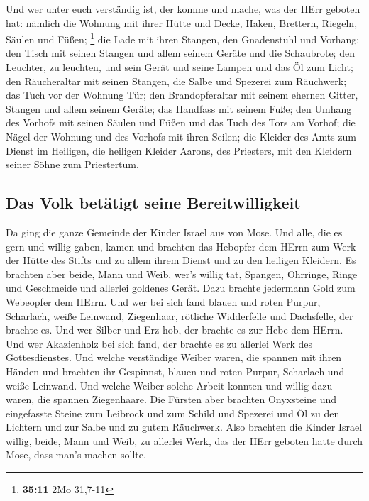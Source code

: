 Und wer unter euch verständig ist, der komme und mache,
was der HErr geboten hat:  nämlich die Wohnung mit ihrer
Hütte und Decke, Haken, Brettern, Riegeln, Säulen und Füßen; \footnote{\textbf{35:11}
  2Mo 31,7-11}  die Lade mit ihren Stangen, den
Gnadenstuhl und Vorhang;  den Tisch mit seinen Stangen
und allem seinem Geräte und die Schaubrote;  den
Leuchter, zu leuchten, und sein Gerät und seine Lampen und das Öl zum
Licht;  den Räucheraltar mit seinen Stangen, die Salbe
und Spezerei zum Räuchwerk; das Tuch vor der Wohnung Tür;
 den Brandopferaltar mit seinem ehernen Gitter, Stangen
und allem seinem Geräte; das Handfass mit seinem Fuße; 
den Umhang des Vorhofs mit seinen Säulen und Füßen und das Tuch des Tors
am Vorhof;  die Nägel der Wohnung und des Vorhofs mit
ihren Seilen;  die Kleider des Amts zum Dienst im
Heiligen, die heiligen Kleider Aarons, des Priesters, mit den Kleidern
seiner Söhne zum Priestertum.

\hypertarget{das-volk-betuxe4tigt-seine-bereitwilligkeit}{%
\subsection{Das Volk betätigt seine
Bereitwilligkeit}\label{das-volk-betuxe4tigt-seine-bereitwilligkeit}}

 Da ging die ganze Gemeinde der Kinder Israel aus von
Mose.  Und alle, die es gern und willig gaben, kamen und
brachten das Hebopfer dem HErrn zum Werk der Hütte des Stifts und zu
allem ihrem Dienst und zu den heiligen Kleidern.  Es
brachten aber beide, Mann und Weib, wer's willig tat, Spangen, Ohrringe,
Ringe und Geschmeide und allerlei goldenes Gerät. Dazu brachte jedermann
Gold zum Webeopfer dem HErrn.  Und wer bei sich fand
blauen und roten Purpur, Scharlach, weiße Leinwand, Ziegenhaar, rötliche
Widderfelle und Dachsfelle, der brachte es.  Und wer
Silber und Erz hob, der brachte es zur Hebe dem HErrn. Und wer
Akazienholz bei sich fand, der brachte es zu allerlei Werk des
Gottesdienstes.  Und welche verständige Weiber waren, die
spannen mit ihren Händen und brachten ihr Gespinnst, blauen und roten
Purpur, Scharlach und weiße Leinwand.  Und welche Weiber
solche Arbeit konnten und willig dazu waren, die spannen Ziegenhaare.
 Die Fürsten aber brachten Onyxsteine und eingefasste
Steine zum Leibrock und zum Schild  und Spezerei und Öl
zu den Lichtern und zur Salbe und zu gutem Räuchwerk. 
Also brachten die Kinder Israel willig, beide, Mann und Weib, zu
allerlei Werk, das der HErr geboten hatte durch Mose, dass man's machen
sollte.

